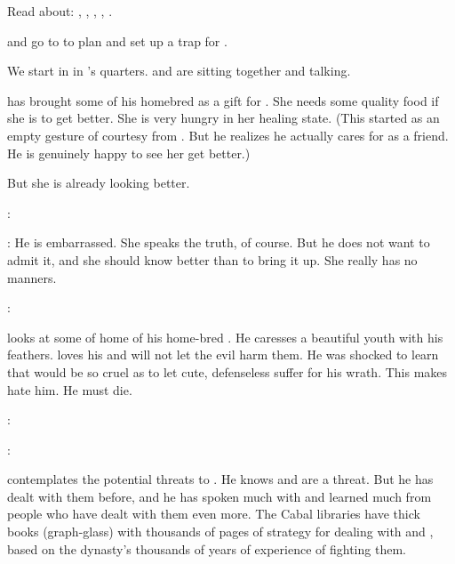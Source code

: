 
Read about: 
\Teshrial, \Urizeth, \Nyx, \noggyaleth, \resphain. 

\Teshrial and \Urizeth go to \Malcur to plan and set up a trap for \Ishnaruchaefir. 



\begin{comment}
  \section{Urizeth worries about Teshrial}
\end{comment}

We start in \Nyx in \Urizeth's quarters.
\Teshrial and \Urizeth are sitting together and talking. 

\Teshrial has brought some of his homebred \humans as a gift for \Urizeth. 
She needs some quality food if she is to get better.
She is very hungry in her healing state. 
(This started as an empty gesture of courtesy from \Teshrial.
 But he realizes he actually cares for \Urizeth as a friend.
 He is genuinely happy to see her get better.)

But she is already looking better. 

\Urizeth:

\Teshrial:
He is embarrassed. 
She speaks the truth, of course.
But he does not want to admit it, and she should know better than to bring it up.
She really has no manners.

\Urizeth:

\Teshrial{} looks at some of home of his home-bred \humans. 
He caresses a beautiful youth with his feathers. 
\Teshrial{} loves his \humans{} and will not let the evil \Ishnaruchaefir{} harm them. 
He was shocked to learn that \Ishnaruchaefir{} would be so cruel as to let cute, defenseless \humans{} suffer for his wrath. 
This makes \Teshrial{} hate him.
He must die. 

\Urizeth:

\Teshrial:

\Teshrial contemplates the potential threats to \Malcur. 
He knows \Secherdamon and \Psyrex are a threat. 
But he has dealt with them before, and he has spoken much with and learned much from people who have dealt with them even more.
The \CiriathSepher Cabal libraries have thick books (graph-glass) with thousands of pages of strategy for dealing with \Secherdamon and \Psyrex, based on the dynasty's thousands of years of experience of fighting them.

